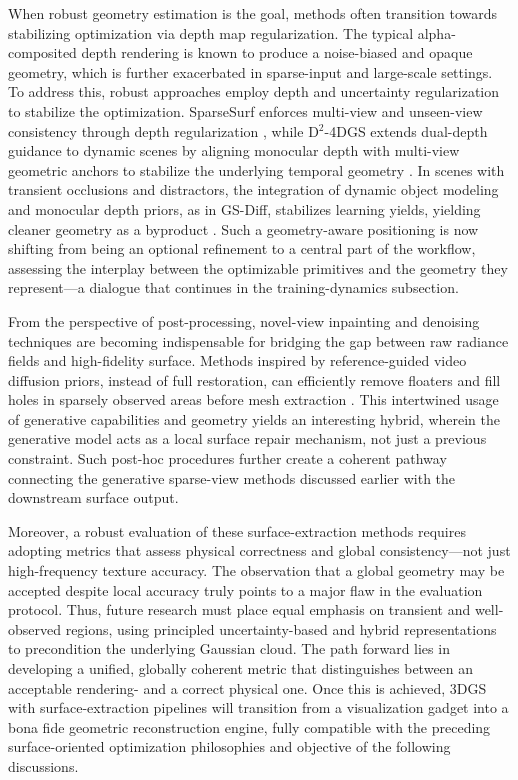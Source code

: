 \documentclass[11pt,a4paper]{article}
\begin{document}
When robust geometry estimation is the goal, methods often transition towards stabilizing optimization via depth map regularization. The typical alpha-composited depth rendering is known to produce a noise-biased and opaque geometry, which is further exacerbated in sparse-input and large-scale settings. To address this, robust approaches employ depth and uncertainty regularization to stabilize the optimization. SparseSurf enforces multi-view and unseen-view consistency through depth regularization \cite{arxiv:2511.14633v1}, while D$^{2}$-4DGS extends dual-depth guidance to dynamic scenes by aligning monocular depth with multi-view geometric anchors to stabilize the underlying temporal geometry \cite{arxiv:2608.01588v1}. In scenes with transient occlusions and distractors, the integration of dynamic object modeling and monocular depth priors, as in GS-Diff, stabilizes learning yields, yielding cleaner geometry as a byproduct \cite{arxiv:2504.01960v1}. Such a geometry-aware positioning is now shifting from being an optional refinement to a central part of the workflow, assessing the interplay between the optimizable primitives and the geometry they represent---a dialogue that continues in the training-dynamics subsection.

From the perspective of post-processing, novel-view inpainting and denoising techniques are becoming indispensable for bridging the gap between raw radiance fields and high-fidelity surface. Methods inspired by reference-guided video diffusion priors, instead of full restoration, can efficiently remove floaters and fill holes in sparsely observed areas before mesh extraction \cite{arxiv:2508.09667v1}. This intertwined usage of generative capabilities and geometry yields an interesting hybrid, wherein the generative model acts as a local surface repair mechanism, not just a previous constraint. Such post-hoc procedures further create a coherent pathway connecting the generative sparse-view methods discussed earlier with the downstream surface output.

Moreover, a robust evaluation of these surface-extraction methods requires adopting metrics that assess physical correctness and global consistency---not just high-frequency texture accuracy. The observation that a global geometry may be accepted despite local accuracy truly points to a major flaw in the evaluation protocol. Thus, future research must place equal emphasis on transient and well-observed regions, using principled uncertainty-based and hybrid representations to precondition the underlying Gaussian cloud. The path forward lies in developing a unified, globally coherent metric that distinguishes between an acceptable rendering- and a correct physical one. Once this is achieved, 3DGS with surface-extraction pipelines will transition from a visualization gadget into a bona fide geometric reconstruction engine, fully compatible with the preceding surface-oriented optimization philosophies and objective of the following discussions.
\end{document}
